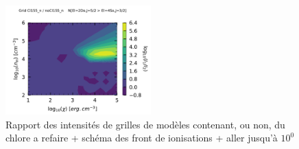 \begin{figure}[!h]
    \centering \includegraphics[trim = {0 0 0 1cm},clip,width=0.5\textwidth]{figure/Cl/gridModelEmiss/map_Cl155_n_noCl155_nI_N.pdf}
    \caption{Rapport des intensités de grilles de modèles contenant, ou non, du chlore a refaire + schéma des front de ionisations + aller jusqu'à $10^0$}
    \label{fig:Cl:gridModelEmiss:N}
\end{figure}










